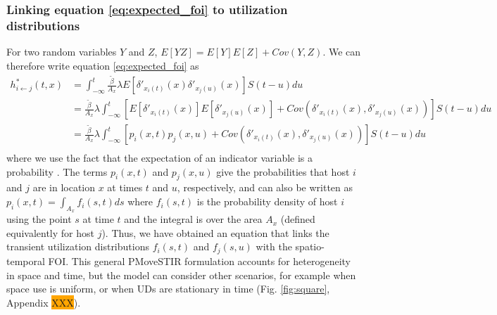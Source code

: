 \documentclass[letterpaper]{article}
\begin{document}
\subsubsection*{Linking equation \ref{eq:expected_foi} to utilization distributions}

For two random variables $Y$ and $Z$, $E[YZ] = E[Y]E[Z] + Cov(Y, Z)$.  We can therefore write equation \ref{eq:expected_foi} as
\begin{equation}
    \begin{aligned}
        h^*_{i \leftarrow j}(t, x) &= \int_{-\infty}^{t} \frac{\tilde{\beta}}{A_x} \lambda E[\delta'_{x_i(t)}(x) \delta'_{x_j(u)}(x)] S(t - u) du \\
        &= \frac{\tilde{\beta}}{A_x} \lambda \int_{-\infty}^{t} [E[\delta'_{x_i(t)}(x)] E[\delta'_{x_j(u)}(x)] + Cov(\delta'_{x_i(t)}(x), \delta'_{x_j(u)}(x))] S(t - u) du \\
        &= \frac{\tilde{\beta}}{A_x} \lambda \int_{-\infty}^{t} [p_i(x, t) p_j(x, u) + Cov(\delta'_{x_i(t)}(x), \delta'_{x_j(u)}(x))] S(t - u) du \\
    \end{aligned}
    \label{eq:foi_cov}
\end{equation}
where we use the fact that the expectation of an indicator variable is a probability \citep{Grimmett2001}. The terms $p_i(x, t)$ and $p_j(x,u)$ give the probabilities that host $i$ and $j$ are in location $x$ at times $t$ and $u$, respectively, and can also be written as $p_i(x, t) = \int_{A_x} f_i(s, t) ds$ where $f_i(s, t)$ is the probability density of host $i$ using the point $s$ at time $t$ and the integral is over the area $A_x$ (defined equivalently for host $j$). Thus, we have obtained an equation that links the transient utilization distributions $f_i(s, t)$ and $f_j(s, u)$ with the spatio-temporal FOI.
This general PMoveSTIR formulation accounts for heterogeneity in space and time, but the model can consider other scenarios, for example when space use is uniform, or when UDs are stationary in time  (Fig. \ref{fig:square}, Appendix \colorbox{orange}{XXX}). 
\end{document}
